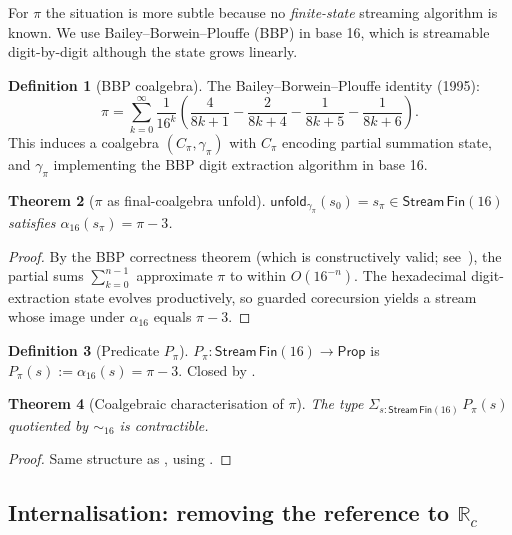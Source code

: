 \documentclass[12pt]{article}
\newtheorem{theorem}{Theorem}[section]
\theoremstyle{definition}
\newtheorem{definition}[theorem]{Definition}
\theoremstyle{remark}
\newcommand{\R}{\mathbb{R}}
\newcommand{\Rc}{\R_c}
\newcommand{\Stream}{\mathsf{Stream}}
\newcommand{\unfold}{\mathsf{unfold}}
\newcommand{\bisim}{\mathrel{\sim}}
\begin{document}
For $\pi$ the situation is more subtle because no \emph{finite-state}
streaming algorithm is known. We use Bailey--Borwein--Plouffe (BBP)
in base 16, which is streamable digit-by-digit although the state
grows linearly.

\begin{definition}[BBP coalgebra]\label{def:bbp}
The Bailey--Borwein--Plouffe identity (1995):
\[
\pi = \sum_{k=0}^\infty \frac{1}{16^k}
\left(\frac{4}{8k+1} - \frac{2}{8k+4} - \frac{1}{8k+5} -
\frac{1}{8k+6}\right).
\]
This induces a coalgebra
$(C_\pi, \gamma_\pi)$ with $C_\pi$ encoding partial summation
state, and $\gamma_\pi$ implementing the BBP digit extraction
algorithm in base 16.
\end{definition}

\begin{theorem}[$\pi$ as final-coalgebra unfold]\label{thm:pi-final}
$\unfold_{\gamma_\pi}(s_0) = s_\pi \in \Stream\,\mathsf{Fin}(16)$
satisfies $\alpha_{16}(s_\pi) = \pi - 3$.
\end{theorem}

\begin{proof}
By the BBP correctness theorem (which is constructively valid;
see~\cite{bbp}), the partial sums $\sum_{k=0}^{n-1}$ approximate
$\pi$ to within $O(16^{-n})$. The hexadecimal digit-extraction
state evolves productively, so guarded corecursion yields a
stream whose image under $\alpha_{16}$ equals $\pi - 3$.
\end{proof}

\begin{definition}[Predicate $P_\pi$]\label{def:Ppi}
$P_\pi: \Stream\,\mathsf{Fin}(16) \to \mathsf{Prop}$ is
$P_\pi(s) := \alpha_{16}(s) = \pi - 3$. Closed by
.
\end{definition}

\begin{theorem}[Coalgebraic characterisation of $\pi$]\label{thm:pi-char}
The type
$\Sigma_{s : \Stream\,\mathsf{Fin}(16)}\,P_\pi(s)$ quotiented by
$\bisim_{16}$ is contractible.
\end{theorem}

\begin{proof}
Same structure as , using .
\end{proof}

\subsection{\texorpdfstring{Internalisation: removing the reference to $\Rc$}{Internalisation: removing the reference to R\_c}}
\end{document}
